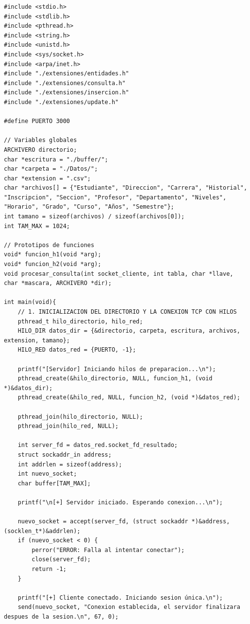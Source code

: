 \documentclass[12pt]{article}
\begin{document}
\begin{lstlisting}[style=estiloC ,title={Código 1. Servidor TCP (MAIN)}]
#include <stdio.h>
#include <stdlib.h>
#include <pthread.h>
#include <string.h>
#include <unistd.h>
#include <sys/socket.h>
#include <arpa/inet.h>
#include "./extensiones/entidades.h"
#include "./extensiones/consulta.h"
#include "./extensiones/insercion.h"
#include "./extensiones/update.h"

#define PUERTO 3000

// Variables globales
ARCHIVERO directorio;
char *escritura = "./buffer/";
char *carpeta = "./Datos/";
char *extension = ".csv";
char *archivos[] = {"Estudiante", "Direccion", "Carrera", "Historial", "Inscripcion", "Seccion", "Profesor", "Departamento", "Niveles", "Horario", "Grado", "Curso", "Años", "Semestre"};
int tamano = sizeof(archivos) / sizeof(archivos[0]);
int TAM_MAX = 1024;

// Prototipos de funciones
void* funcion_h1(void *arg);
void* funcion_h2(void *arg);
void procesar_consulta(int socket_cliente, int tabla, char *llave, char *mascara, ARCHIVERO *dir);

int main(void){
    // 1. INICIALIZACION DEL DIRECTORIO Y LA CONEXION TCP CON HILOS
    pthread_t hilo_directorio, hilo_red;
    HILO_DIR datos_dir = {&directorio, carpeta, escritura, archivos, extension, tamano};
    HILO_RED datos_red = {PUERTO, -1}; 
    
    printf("[Servidor] Iniciando hilos de preparacion...\n");
    pthread_create(&hilo_directorio, NULL, funcion_h1, (void *)&datos_dir);
    pthread_create(&hilo_red, NULL, funcion_h2, (void *)&datos_red);

    pthread_join(hilo_directorio, NULL);
    pthread_join(hilo_red, NULL);

    int server_fd = datos_red.socket_fd_resultado;
    struct sockaddr_in address;
    int addrlen = sizeof(address);
    int nuevo_socket;
    char buffer[TAM_MAX];

    printf("\n[+] Servidor iniciado. Esperando conexion...\n");

    nuevo_socket = accept(server_fd, (struct sockaddr *)&address, (socklen_t*)&addrlen);
    if (nuevo_socket < 0) {
        perror("ERROR: Falla al intentar conectar");
        close(server_fd);
        return -1;
    }

    printf("[+] Cliente conectado. Iniciando sesion única.\n");
    send(nuevo_socket, "Conexion establecida, el servidor finalizara despues de la sesion.\n", 67, 0);


\end{lstlisting}
\end{document}
